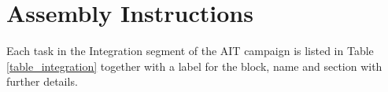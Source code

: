 \section{Assembly Instructions}
Each task in the Integration segment of the \ac{AIT} campaign is listed in Table \ref{table_integration} together with a label for the block, name and section with further details. %



